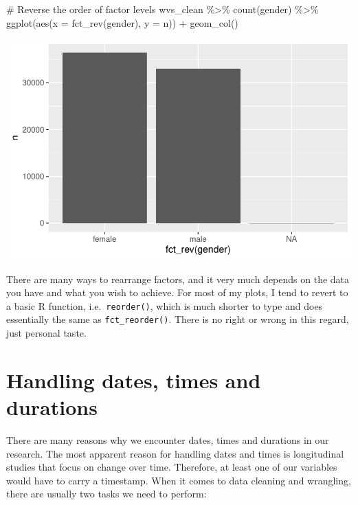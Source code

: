 \documentclass[
  letterpaper,
]{krantz}
\makeatletter
\newenvironment{Shaded}{\begin{snugshade}}{\end{snugshade}}
\newcommand{\AttributeTok}[1]{\textcolor[rgb]{0.40,0.45,0.13}{#1}}
\newcommand{\CommentTok}[1]{\textcolor[rgb]{0.37,0.37,0.37}{#1}}
\newcommand{\FunctionTok}[1]{\textcolor[rgb]{0.28,0.35,0.67}{#1}}
\newcommand{\NormalTok}[1]{\textcolor[rgb]{0.00,0.23,0.31}{#1}}
\newcommand{\SpecialCharTok}[1]{\textcolor[rgb]{0.37,0.37,0.37}{#1}}
\newenvironment{kframe}{%
\medskip{}
\setlength{\fboxsep}{.8em}
 \def\at@end@of@kframe{}%
 \ifinner\ifhmode%
  \def\at@end@of@kframe{\end{minipage}}%
  \begin{minipage}{\columnwidth}%
 \fi\fi%
 \def\FrameCommand##1{\hskip\@totalleftmargin \hskip-\fboxsep
 \colorbox{shadecolor}{##1}\hskip-\fboxsep
     \hskip-\linewidth \hskip-\@totalleftmargin \hskip\columnwidth}%
 \MakeFramed {\advance\hsize-\width
   \@totalleftmargin\z@ \linewidth\hsize
   \@setminipage}}%
 {\par\unskip\endMakeFramed%
 \at@end@of@kframe}
\renewenvironment{Shaded}{\begin{kframe}}{\end{kframe}}
\makeatother
\begin{document}
\begin{Shaded}
\begin{Highlighting}[]
\CommentTok{\# Reverse the order of factor levels}
\NormalTok{wvs\_clean }\SpecialCharTok{\%\textgreater{}\%}
  \FunctionTok{count}\NormalTok{(gender) }\SpecialCharTok{\%\textgreater{}\%}
  \FunctionTok{ggplot}\NormalTok{(}\FunctionTok{aes}\NormalTok{(}\AttributeTok{x =} \FunctionTok{fct\_rev}\NormalTok{(gender),}
             \AttributeTok{y =}\NormalTok{ n)) }\SpecialCharTok{+}
  \FunctionTok{geom\_col}\NormalTok{()}
\end{Highlighting}
\end{Shaded}

\includegraphics{07_data_wrangling_files/figure-pdf/reverse-order-1.pdf}

There are many ways to rearrange factors, and it very much depends on
the data you have and what you wish to achieve. For most of my plots, I
tend to revert to a basic R function, i.e.~\texttt{reorder()}, which is
much shorter to type and does essentially the same as
\texttt{fct\_reorder()}. There is no right or wrong in this regard, just
personal taste.

\section{Handling dates, times and
durations}\label{handling-dates-times-and-durations}

There are many reasons why we encounter dates, times and durations in
our research. The most apparent reason for handling dates and times is
longitudinal studies that focus on change over time. Therefore, at least
one of our variables would have to carry a timestamp. When it comes to
data cleaning and wrangling, there are usually two tasks we need to
perform:
\end{document}
